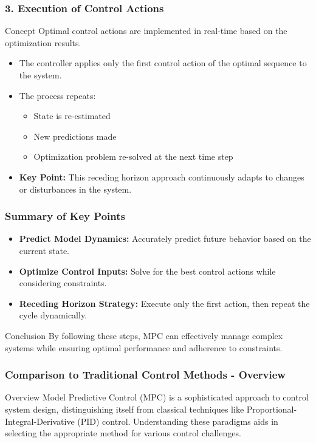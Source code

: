 \documentclass[aspectratio=169]{beamer}
\begin{document}
\begin{frame}[fragile]
    \frametitle{3. Execution of Control Actions}
    \begin{block}{Concept}
        Optimal control actions are implemented in real-time based on the optimization results.
    \end{block}
    \begin{itemize}
        \item The controller applies only the first control action of the optimal sequence to the system.
        \item The process repeats:
            \begin{itemize}
                \item State is re-estimated
                \item New predictions made
                \item Optimization problem re-solved at the next time step
            \end{itemize}
        \item \textbf{Key Point:} This receding horizon approach continuously adapts to changes or disturbances in the system.
    \end{itemize}
\end{frame}

\begin{frame}[fragile]
    \frametitle{Summary of Key Points}
    \begin{itemize}
        \item \textbf{Predict Model Dynamics:} Accurately predict future behavior based on the current state.
        \item \textbf{Optimize Control Inputs:} Solve for the best control actions while considering constraints.
        \item \textbf{Receding Horizon Strategy:} Execute only the first action, then repeat the cycle dynamically.
    \end{itemize}
    \begin{block}{Conclusion}
        By following these steps, MPC can effectively manage complex systems while ensuring optimal performance and adherence to constraints.
    \end{block}
\end{frame}

\begin{frame}[fragile]
    \frametitle{Comparison to Traditional Control Methods - Overview}
    \begin{block}{Overview}
        Model Predictive Control (MPC) is a sophisticated approach to control system design, distinguishing itself from classical techniques like Proportional-Integral-Derivative (PID) control. Understanding these paradigms aids in selecting the appropriate method for various control challenges.
    \end{block}
\end{frame}
\end{document}
